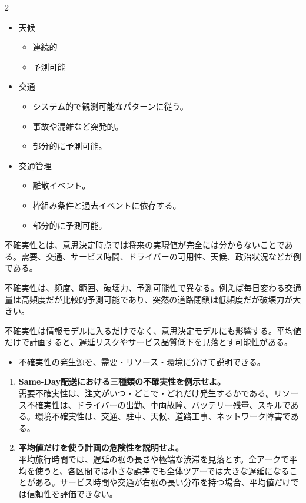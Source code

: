 \clearpage
{}
\begin{multicols}{2}\footnotesize\raggedcolumns
{}
\begin{itemize}
\item 天候
\begin{itemize}
\item 連続的
\item 予測可能
\end{itemize}
\item 交通
\begin{itemize}
\item システム的で観測可能なパターンに従う。
\item 事故や混雑など突発的。
\item 部分的に予測可能。
\end{itemize}
\item 交通管理
\begin{itemize}
\item 離散イベント。
\item 枠組み条件と過去イベントに依存する。
\item 部分的に予測可能。
\end{itemize}
\end{itemize}
不確実性とは、意思決定時点では将来の実現値が完全には分からないことである。需要、交通、サービス時間、ドライバーの可用性、天候、政治状況などが例である。\par

不確実性は、頻度、範囲、破壊力、予測可能性で異なる。例えば毎日変わる交通量は高頻度だが比較的予測可能であり、突然の道路閉鎖は低頻度だが破壊力が大きい。\par

不確実性は情報モデルに入るだけでなく、意思決定モデルにも影響する。平均値だけで計画すると、遅延リスクやサービス品質低下を見落とす可能性がある。\par
{}
\begin{itemize}
\item 不確実性の発生源を、需要・リソース・環境に分けて説明できる。
\end{itemize}
\begin{enumerate}
\item \textbf{Same-Day配送における三種類の不確実性を例示せよ。}\\需要不確実性は、注文がいつ・どこで・どれだけ発生するかである。リソース不確実性は、ドライバーの出勤、車両故障、バッテリー残量、スキルである。環境不確実性は、交通、駐車、天候、道路工事、ネットワーク障害である。
\item \textbf{平均値だけを使う計画の危険性を説明せよ。}\\平均旅行時間では、遅延の裾の長さや極端な渋滞を見落とす。全アークで平均を使うと、各区間では小さな誤差でも全体ツアーでは大きな遅延になることがある。サービス時間や交通が右裾の長い分布を持つ場合、平均値だけでは信頼性を評価できない。
\end{enumerate}
\end{multicols}

